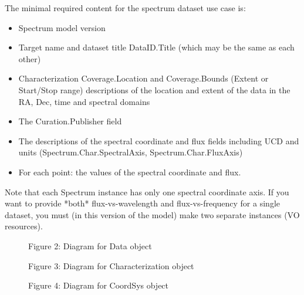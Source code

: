 \documentclass[11pt]{article}
\begin{document}
The minimal required content for the spectrum dataset use case is:

\begin{itemize}
\item Spectrum model version
\item Target name and dataset title DataID.Title (which may be the same as each other)
\item  Characterization Coverage.Location and Coverage.Bounds (Extent or Start/Stop range) descriptions
       of the location and extent of the data in the RA, Dec, time and spectral domains
\item  The Curation.Publisher field
\item  The descriptions of the spectral coordinate and flux
fields including UCD and units  (Spectrum.Char.SpectralAxis, Spectrum.Char.FluxAxis)
\item  For each point: the values of the spectral coordinate and flux.
\end{itemize}

Note that each Spectrum instance has only one spectral coordinate axis.
If you want to provide *both* flux-vs-wavelength and flux-vs-frequency
for a single dataset, you must (in this version of the model)
make two separate instances (VO resources).




\begin{figure}[h]

\colorbox{iblue}{
}
{
\colorbox{iblue}{
\begin{minipage}{6.0in}
Figure 2: Diagram for Data object

\end{minipage}
}
}

\colorbox{iblue}{
}
{
\colorbox{iblue}{
\begin{minipage}{6.0in}
Figure 3: Diagram for Characterization object
\end{minipage}
}
}

\end{figure}


\begin{figure}[h]


\colorbox{iblue}{
}
{
\colorbox{iblue}{
\begin{minipage}{6.0in}
Figure 4: Diagram for CoordSys object

\end{minipage}
}
}
\end{figure}
\end{document}
